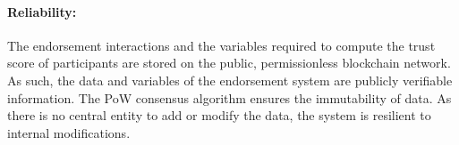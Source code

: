 \paragraph{Reliability:}The endorsement interactions and the variables required
to compute the trust score of participants are stored on the public,
permissionless blockchain network. As such, the data and variables of the
endorsement system are publicly verifiable information. The \ac{PoW} consensus
algorithm ensures the immutability of data. As there is no central entity to
add or modify the data, the system is resilient to internal modifications. 
%
%
